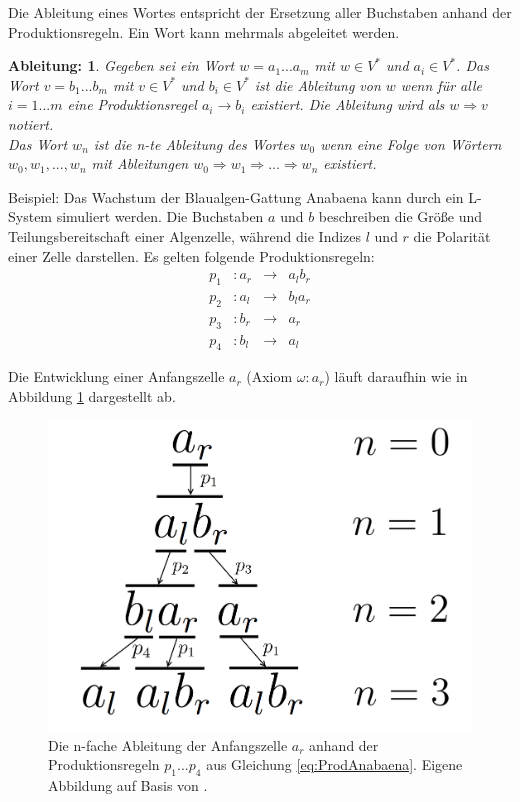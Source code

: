 Die Ableitung eines Wortes entspricht der Ersetzung aller Buchstaben anhand der Produktionsregeln. Ein Wort kann mehrmals abgeleitet werden. 

\newtheorem{defAbleitung}{Ableitung:}[chapter]
\begin{defAbleitung}
	Gegeben sei ein Wort $w = a_1 ... a_m$ mit $w \in V^*$ und $a_i \in V^*$. Das Wort $v = b_1 ... b_m$ mit $v \in V^*$ und $b_i \in V^*$ ist die Ableitung von $w$ wenn für alle $i=1...m$ eine Produktionsregel $a_i \rightarrow b_i$ existiert. Die Ableitung wird als $w \Rightarrow v$ notiert. \\
	Das Wort $w_n$ ist die n-te Ableitung des Wortes $w_0$ wenn eine Folge von Wörtern $w_0, w_1, ..., w_n$ mit Ableitungen $w_0 \Rightarrow w_1 \Rightarrow ... \Rightarrow w_n$ existiert. \cite[S.4]{ABOP:04} 
\end{defAbleitung}


Beispiel: Das Wachstum der Blaualgen-Gattung \glqq Anabaena\grqq{} kann durch ein L-System simuliert werden. Die Buchstaben $a$ und $b$ beschreiben die Größe und Teilungsbereitschaft einer Algenzelle, während die Indizes $l$ und $r$ die Polarität einer Zelle darstellen. Es gelten folgende Produktionsregeln:
\begin{equation}
\begin{array}{cccc}
 p_1 & : a_r &\rightarrow& a_lb_r \\
p_2 &  : a_l &\rightarrow& b_la_r \\ 
p_3 &  : b_r &\rightarrow& a_r \\
p_4 &  : b_l &\rightarrow& a_l 
\end{array}
\label{eq:ProdAnabaena}
\end{equation} 

Die Entwicklung einer Anfangszelle $a_r$ (Axiom $\omega : a_r$) läuft daraufhin wie in Abbildung \ref{fig:AnabaenaAbleitung} dargestellt ab.
\begin{figure} [hbtp]
	\centering
	\includegraphics[height=0.25\textheight]{images/AnabaenaAbleitung.png}
	\caption{Die n-fache Ableitung der Anfangszelle $a_r$ anhand der Produktionsregeln $p_1 ... p_4$ aus Gleichung \ref{eq:ProdAnabaena}. Eigene Abbildung auf Basis von \cite[S.4]{ABOP:04}.}
	\label{fig:AnabaenaAbleitung}
\end{figure}

